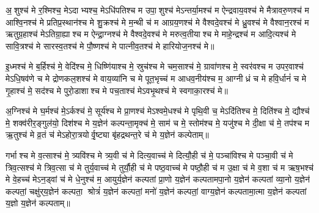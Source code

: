 
अ॒शुश्च॑ मे र॒श्मिश्च॒ मेऽदाभ्यश्च॒ मेऽधि॑पतिश्च म उपा॒शुश्च॑ मेऽन्तर्या॒मश्च॑ म ऐन्द्रवाय॒वश्च॑ मे मैत्रावरु॒णश्च॑ म आश्वि॒नश्च॑ मे प्रतिप्र॒स्थान॑श्च मे शु॒क्रश्च॑ मे म॒न्थी च॑ म आग्रय॒णश्च॑ मे वैश्वदे॒वश्च॑ मे ध्रु॒वश्च॑ मे वैश्वान॒रश्च॑ म ऋतुग्र॒हाश्च॑ मेऽतिग्रा॒ह्याश्च म ऐन्द्रा॒ग्नश्च॑ मे वैश्वदे॒वश्च॑ मे मरुत्व॒तीयाश्च मे माहे॒न्द्रश्च॑ म आदि॒त्यश्च॑ मे सावि॒त्रश्च॑ मे सारस्व॒तश्च॑ मे पौ॒ष्णश्च॑ मे पात्नीव॒तश्च॑ मे हारियोज॒नश्च॑ मे॥ 


इ॒ध्मश्च॑ मे ब॒र्हिश्च॑ मे॒ वेदि॑श्च मे॒ धिष्णि॑याश्च मे॒ स्रुच॑श्च मे चम॒साश्च॑ मे॒ ग्रावा॑णश्च मे॒ स्वर॑वश्च म उपर॒वाश्च॑ मेऽधि॒षव॑णे च मे द्रोणकल॒शश्च॑ मे वाय॒व्या॑नि च मे पूत॒भृच्च॑ म आधव॒नीय॑श्च म॒ आग्नीध्रं च मे हवि॒र्धानं॑ च मे गृ॒हाश्च॑ मे॒ सद॑श्च मे पुरो॒डाशाश्च मे पच॒ताश्च॑ मेऽवभृ॒थश्च॑ मे स्वगाका॒रश्च॑ मे॥ 


अ॒ग्निश्च॑ मे घ॒र्मश्च॑ मे॒ऽर्कश्च॑ मे॒ सूर्य॑श्च मे प्रा॒णश्च॑ मेऽश्वमे॒धश्च॑ मे पृथि॒वी च॒ मेऽदि॑तिश्च मे॒ दिति॑श्च मे॒ द्यौश्च॑ मे॒ शक्व॑रीर॒ङ्गुल॑यो॒ दिश॑श्च मे य॒ज्ञेन॑ कल्पन्ता॒मृक्च॑ मे॒ साम॑ च मे॒ स्तोम॑श्च मे॒ यजु॑श्च मे दी॒क्षा च॑ मे॒ तप॑श्च म ऋ॒तुश्च॑ मे व्र॒तं च॑ मेऽहोरा॒त्रयोर्वृ॒ष्ट्या बृ॑हद्रथन्त॒रे च॑ मे य॒ज्ञेन॑ कल्पेताम्॥ 


गर्भाश्च मे व॒त्साश्च॑ मे॒ त्र्यवि॑श्च मे त्र्य॒वी च॑ मे दित्य॒वाच्च॑ मे दित्यौ॒ही च॑ मे॒ पञ्चा॑विश्च मे पञ्चा॒वी च॑ मे त्रिव॒त्सश्च॑ मे त्रिव॒त्सा च॑ मे तुर्य॒वाच्च॑ मे तुर्यौ॒ही च॑ मे पष्ठ॒वाच्च॑ मे पष्ठौ॒ही च॑ म उ॒क्षा च॑ मे व॒शा च॑ म ऋष॒भश्च॑ मे वे॒हच्च॑ मेऽन॒ड्वां च॑ मे धे॒नुश्च॑ म॒ आयुर्य॒ज्ञेन॑ कल्पतां प्रा॒णो य॒ज्ञेन॑ कल्पतामपा॒नो य॒ज्ञेन॑ कल्पतां व्या॒नो य॒ज्ञेन॑ कल्पतां॒ चक्षु॑र्‌य॒ज्ञेन॑ कल्पता॒ श्रोत्रं॑ य॒ज्ञेन॑ कल्पतां॒ मनो॑ य॒ज्ञेन॑ कल्पतां॒ वाग्य॒ज्ञेन॑ कल्पतामा॒त्मा य॒ज्ञेन॑ कल्पतां य॒ज्ञो य॒ज्ञेन॑ कल्पताम्॥ 

